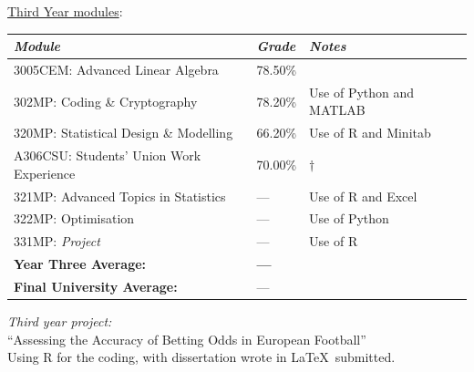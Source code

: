 \documentclass[9pt,a4paper]{article}
\begin{document}
\noindent\underline{Third Year modules}: \\
\begin{tabular}{p{6.2cm}|p{1.1cm}|p{3.5cm}}
	\emph{Module}						&\emph{Grade}	&\emph{Notes}\\\hline\hline
	3005CEM: Advanced Linear Algebra	&78.50\%		&\\\hdashline
	302MP: Coding \& Cryptography		&78.20\%		&Use of Python and MATLAB\\\hdashline
	320MP: Statistical Design \& Modelling&66.20\%		&Use of R and Minitab\\\hdashline
	A306CSU: Students' Union Work Experience&70.00\%&$\dagger$\\\hdashline
	321MP: Advanced Topics in Statistics	& --- &Use of R and Excel\\\hdashline
	322MP: Optimisation		&---			&Use of Python\\\hdashline
	331MP: \textit{Project}				& ---		&Use of R\\\hline
	\textbf{Year Three Average:}&\textbf{---}& \\ \hline
	\textbf{Final University Average:} & ---
\end{tabular}
\vspace{7mm}

\noindent\textit{Third year project: }\\``Assessing the Accuracy of Betting Odds in European Football''\\
Using R for the coding, with dissertation wrote in \LaTeX\ submitted.

\pagebreak
\end{document}

